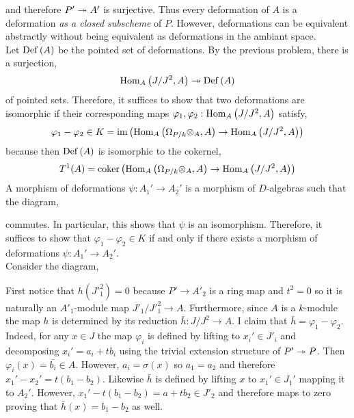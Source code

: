 \documentclass[12pt]{article}
\begin{document}
and therefore $P' \twoheadrightarrow A'$ is surjective. Thus every deformation of $A$ is a deformation \textit{as a closed subscheme} of $P$. However, deformations can be equivalent abstractly without being equivalent as deformations in the ambiant space. 
\bigskip\\
Let $\mathrm{Def}\left( A \right)$ be the pointed set of deformations. By the previous problem, there is a surjection,
\[ \mathrm{Hom}_{A} \left( J/J^2, A \right) \twoheadrightarrow \mathrm{Def}\left( A \right) \]
of pointed sets. Therefore, it suffices to show that two deformations are isomorphic if their corresponding maps $\varphi_1, \varphi_2 : \mathrm{Hom}_{A} \left( J/J^2, A \right)$ satisfy,
\[ \varphi_1 - \varphi_2 \in K = \operatorname{\mathrm{im}}{\left(\mathrm{Hom}_{A} \left( \Omega_{P/k} \otimes_A, A \right) \to \mathrm{Hom}_{A} \left( J/J^2, A \right) \right)} \]
because then $\mathrm{Def}\left( A \right)$ is isomorphic to the cokernel,
\[ T^1(A) = \operatorname{\mathrm{coker}}{\left(\mathrm{Hom}_{A} \left( \Omega_{P/k} \otimes_A, A \right) \to \mathrm{Hom}_{A} \left( J/J^2, A \right) \right)} \]
A morphism of deformations $\psi : A_1' \to A_2'$ is a morphism of $D$-algebras such that the diagram,
\begin{center}
\end{center}
commutes. In particular, this shows that $\psi$ is an isomorphism. Therefore, it suffices to show that $\varphi_1 - \varphi_2 \in K$ if and only if there exists a morphism of deformations $\psi : A_1' \to A_2'$. 
\bigskip\\
Consider the diagram,
\begin{center}
\end{center}
First notice that $h(J'^2_1) = 0$ because $P' \to A'_2$ is a ring map and $t^2 = 0$ so it is naturally an $A'_1$-module map $J'_1/J'^2_1 \to A$. Furthermore, since $A$ is a $k$-module the map $h$ is determined by its reduction $\bar{h} : J / J^2 \to A$. I claim that $\bar{h} = \varphi_1 - \varphi_2$. Indeed, for any $x \in J$ the map $\varphi_i$ is defined by lifting to $x_i' \in J'_i$ and decomposing $x_i' = a_i + t b_i$ using the trivial extension structure of $P' \twoheadrightarrow P$. Then $\varphi_i(x) = \bar{b_i} \in A$. However, $a_i = \sigma(x)$ so $a_1 = a_2$ and therefore $x_1' - x_2' = t(b_1 - b_2)$. Likewise $\bar{h}$ is defined by lifting $x$ to $x_1' \in J_1'$ mapping it to $A_2'$. However, $x_1' - t(b_1 - b_2) = a + t b_2 \in J'_2$ and therefore maps to zero proving that $\bar{h}(x) = b_1 - b_2$ as well. 
\end{document}
